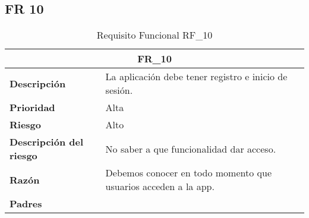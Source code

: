 \documentclass{scrreprt}
\begin{document}
\subsection{FR 10}
\begin{table}[H]
    \label{tab:my-table}
    \begin{tabular}{|p{5cm}|p{11cm}|}
    \hline
    \multicolumn{2}{|c|}{\textbf{FR_10}} \\
    \hline
    \textbf{Descripción  }                      &  La aplicación debe tener registro e inicio de sesión.                                                                       \\ \hline
    \textbf{Prioridad}                          & Alta                                                                                              \\ \hline
    \textbf{Riesgo}                          & Alto                                                                                                \\ \hline
    \textbf{Descripción del riesgo}                    & No saber a que funcionalidad dar acceso.                                                                \\ \hline
    \textbf{Razón}                   & Debemos conocer en todo momento que usuarios acceden a la app.                                                                                             \\ \hline
    \textbf{Padres}                               &  \\  \hline
    \end{tabular}%
    
    \caption{Requisito Funcional RF_10}
\end{table}
\end{document}
